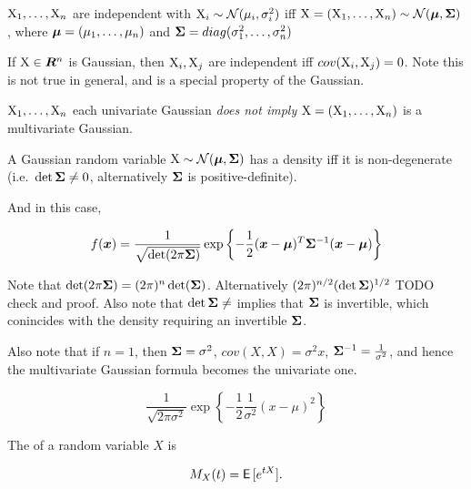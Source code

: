 \begin{rem}
  ${\textnormal{X}}_1, \dots, {\textnormal{X}}_n$ are independent with ${\textnormal{X}}_i \sim {\mathcal{N}}(\mu_i,
  \sigma_i^2)$ iff ${\textnormal{X}} = ({\textnormal{X}}_1, \dots, {\textnormal{X}}_n) \sim {\mathcal{N}}({\bm{\mu}}, {\bm{\Sigma}})$,
  where ${\bm{\mu}} = (\mu_1, \dots, \mu_n)$ and ${\bm{\Sigma}} = diag(\sigma_1^2, \dots,
  \sigma_n^2)$
\end{rem}

\begin{thm}
  If ${\textnormal{X}} \in {\bm{R}}^n$ is Gaussian, then ${\textnormal{X}}_i, {\textnormal{X}}_j$ are independent iff
  $cov({\textnormal{X}}_i, {\textnormal{X}}_j) = 0$. Note this is not true in general, and is a special
  property of the Gaussian.
\end{thm}

\begin{thm}
  ${\textnormal{X}}_1, \dots, {\textnormal{X}}_n$ each univariate Gaussian \emph{does not imply} ${\textnormal{X}} =
  ({\textnormal{X}}_1, \dots, {\textnormal{X}}_n)$ is a multivariate Gaussian.
\end{thm}

\begin{thm}
  A Gaussian random variable ${\textnormal{X}} \sim {\mathcal{N}}({\bm{\mu}}, {\bm{\Sigma}})$ has a density iff
  it is non-degenerate (i.e.\ $\det {\bm{\Sigma}} \neq 0$, alternatively ${\bm{\Sigma}}$
  is positive-definite).

  And in this case,

  \begin{equation}
    \label{eq:mvn-definition}
    f({\bm{x}}) = \frac{1}{\sqrt{\det(2 \pi {\bm{\Sigma}})}} \exp{ \left\{ - \frac{1}{2}
    ({\bm{x}}- {\bm{\mu}})^T {\bm{\Sigma}}^{-1} ({\bm{x}}- {\bm{\mu}}) \right\} }
  \end{equation}

  Note that $\det(2 \pi {\bm{\Sigma}}) = (2\pi)^n \det({\bm{\Sigma}})$. Alternatively $(2
  \pi)^{n/2} (\det {\bm{\Sigma}})^{1/2}$ {TODO check and proof}. Also note that
  $\det {\bm{\Sigma}} \neq$ implies that ${\bm{\Sigma}}$ is invertible, which conincides
  with the density requiring an invertible ${\bm{\Sigma}}$.

  Also note that if $n = 1$, then ${\bm{\Sigma}} = \sigma^2$, $cov(X, X) = \sigma^2
  x$, ${\bm{\Sigma}}^{-1} = \frac{1}{\sigma^2}$, and hence the multivariate
  Gaussian formula becomes the univariate one.

  \begin{equation}
    \frac{1}{\sqrt{2 \pi \sigma^2}} \exp{\left\{ - \frac{1}{2} \frac{1}{\sigma^2} (x - \mu)^2\right\}}
  \end{equation}
\end{thm}

\begin{defn}
  The  of a random variable $X$ is

  \begin{equation}
    M_X(t) = \operatorname{\textsf{E}\,}[e^{t X}].
  \end{equation}
\end{defn}


